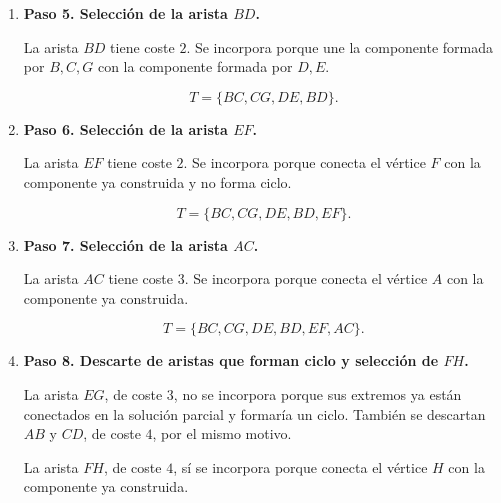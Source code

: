 \begin{enumerate}
La siguiente arista de coste mínimo es $DE$, con coste $1$. Se incorpora porque conecta dos vértices que forman una nueva componente y no genera ningún ciclo.

\[
T=\{BC,CG,DE\}.
\]


\item \textbf{Paso 5. Selección de la arista $BD$.}

La arista $BD$ tiene coste $2$. Se incorpora porque une la componente formada por $B,C,G$ con la componente formada por $D,E$.

\[
T=\{BC,CG,DE,BD\}.
\]


\item \textbf{Paso 6. Selección de la arista $EF$.}

La arista $EF$ tiene coste $2$. Se incorpora porque conecta el vértice $F$ con la componente ya construida y no forma ciclo.

\[
T=\{BC,CG,DE,BD,EF\}.
\]


\item \textbf{Paso 7. Selección de la arista $AC$.}

La arista $AC$ tiene coste $3$. Se incorpora porque conecta el vértice $A$ con la componente ya construida.

\[
T=\{BC,CG,DE,BD,EF,AC\}.
\]


\item \textbf{Paso 8. Descarte de aristas que forman ciclo y selección de $FH$.}

La arista $EG$, de coste $3$, no se incorpora porque sus extremos ya están conectados en la solución parcial y formaría un ciclo. También se descartan $AB$ y $CD$, de coste $4$, por el mismo motivo.

La arista $FH$, de coste $4$, sí se incorpora porque conecta el vértice $H$ con la componente ya construida.


\end{enumerate}
